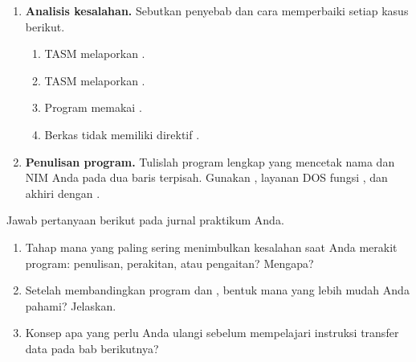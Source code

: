 \begin{enumerate}
    \item \textbf{Analisis kesalahan.} Sebutkan penyebab dan cara
          memperbaiki setiap kasus berikut.
          \begin{enumerate}
              \item TASM melaporkan .
              \item TASM melaporkan .
              \item Program  memakai .
              \item Berkas tidak memiliki direktif .
          \end{enumerate}

    \item \textbf{Penulisan program.} Tulislah program 
          lengkap yang mencetak nama dan NIM Anda pada dua baris
          terpisah. Gunakan , layanan DOS
           fungsi , dan akhiri dengan
          .
\end{enumerate}

\begin{refleksibox}
\vspace{1.1em}
Jawab pertanyaan berikut pada jurnal praktikum Anda.
\begin{enumerate}
    \item Tahap mana yang paling sering menimbulkan kesalahan saat
          Anda merakit program: penulisan, perakitan, atau
          pengaitan? Mengapa?
    \item Setelah membandingkan program  dan ,
          bentuk mana yang lebih mudah Anda pahami? Jelaskan.
    \item Konsep apa yang perlu Anda ulangi sebelum mempelajari
          instruksi transfer data pada bab berikutnya?
\end{enumerate}
\end{refleksibox}
